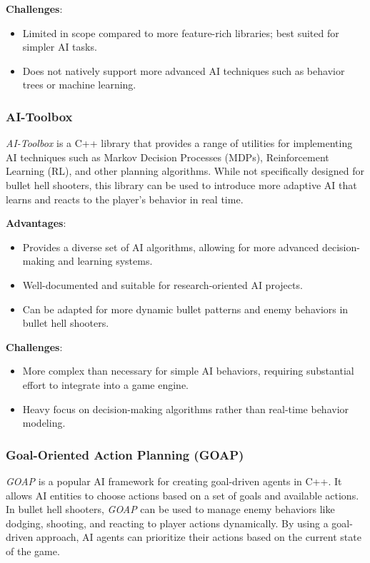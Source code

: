 \textbf{Challenges}:
\begin{itemize}
    \item Limited in scope compared to more feature-rich libraries; best suited for simpler AI tasks.
    \item Does not natively support more advanced AI techniques such as behavior trees or machine learning.
\end{itemize}

\subsubsection{AI-Toolbox}

\textit{AI-Toolbox} is a C++ library that provides a range of utilities for implementing AI techniques such as Markov Decision Processes (MDPs), Reinforcement Learning (RL), and other planning algorithms. While not specifically designed for bullet hell shooters, this library can be used to introduce more adaptive AI that learns and reacts to the player’s behavior in real time.

\textbf{Advantages}:
\begin{itemize}
    \item Provides a diverse set of AI algorithms, allowing for more advanced decision-making and learning systems.
    \item Well-documented and suitable for research-oriented AI projects.
    \item Can be adapted for more dynamic bullet patterns and enemy behaviors in bullet hell shooters.
\end{itemize}

\textbf{Challenges}:
\begin{itemize}
    \item More complex than necessary for simple AI behaviors, requiring substantial effort to integrate into a game engine.
    \item Heavy focus on decision-making algorithms rather than real-time behavior modeling.
\end{itemize}

\subsubsection{Goal-Oriented Action Planning (GOAP)}

\textit{GOAP} is a popular AI framework for creating goal-driven agents in C++. It allows AI entities to choose actions based on a set of goals and available actions. In bullet hell shooters, \textit{GOAP} can be used to manage enemy behaviors like dodging, shooting, and reacting to player actions dynamically. By using a goal-driven approach, AI agents can prioritize their actions based on the current state of the game.

